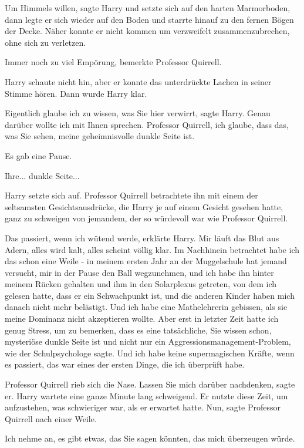 \glqq Um Himmels willen\grqq{}, sagte Harry und setzte sich auf den harten
Marmorboden, dann legte er sich wieder auf den Boden und starrte hinauf zu den
fernen Bögen der Decke. Näher konnte er nicht kommen um verzweifelt
zusammenzubrechen, ohne sich zu verletzen.

\glqq Immer noch zu viel Empörung\grqq{}, bemerkte Professor Quirrell.

Harry schaute nicht hin, aber er konnte das unterdrückte Lachen in seiner Stimme
hören. Dann wurde Harry klar.

\glqq Eigentlich glaube ich zu wissen, was Sie hier verwirrt\grqq{}, sagte
Harry. \glqq Genau darüber wollte ich mit Ihnen sprechen. Professor Quirrell,
ich glaube, dass das, was Sie sehen, meine geheimnisvolle dunkle Seite
ist.\grqq{}

Es gab eine Pause.

\glqq Ihre... dunkle Seite...\grqq{}

Harry setzte sich auf. Professor Quirrell betrachtete ihn mit einem der
seltsamsten Gesichtsausdrücke, die Harry je auf einem Gesicht gesehen hatte,
ganz zu schweigen von jemandem, der so würdevoll war wie Professor Quirrell.

\glqq Das passiert, wenn ich wütend werde\grqq{}, erklärte Harry. \glqq Mir
läuft das Blut aus Adern, alles wird kalt, alles scheint völlig klar. Im
Nachhinein betrachtet habe ich das schon eine Weile - in meinem ersten Jahr an
der Muggelschule hat jemand versucht, mir in der Pause den Ball wegzunehmen, und
ich habe ihn hinter meinem Rücken gehalten und ihm in den Solarplexus getreten,
von dem ich gelesen hatte, dass er ein Schwachpunkt ist, und die anderen Kinder
haben mich danach nicht mehr belästigt. Und ich habe eine Mathelehrerin
gebissen, als sie meine Dominanz nicht akzeptieren wollte. Aber erst in letzter
Zeit hatte ich genug Stress, um zu bemerken, dass es eine tatsächliche, Sie
wissen schon, mysteriöse dunkle Seite ist und nicht nur ein
Aggressionsmanagement-Problem, wie der Schulpsychologe sagte. Und ich habe keine
supermagischen Kräfte, wenn es passiert, das war eines der ersten Dinge, die ich
überprüft habe.\grqq{}

Professor Quirrell rieb sich die Nase. \glqq Lassen Sie mich darüber
nachdenken\grqq{}, sagte er. Harry wartete eine ganze Minute lang schweigend.
Er nutzte diese Zeit, um aufzustehen, was schwieriger war, als er erwartet
hatte. \glqq Nun\grqq{}, sagte Professor Quirrell nach einer Weile.

\glqq Ich nehme an, es gibt etwas, das Sie sagen könnten, das mich überzeugen
würde.\grqq{}

